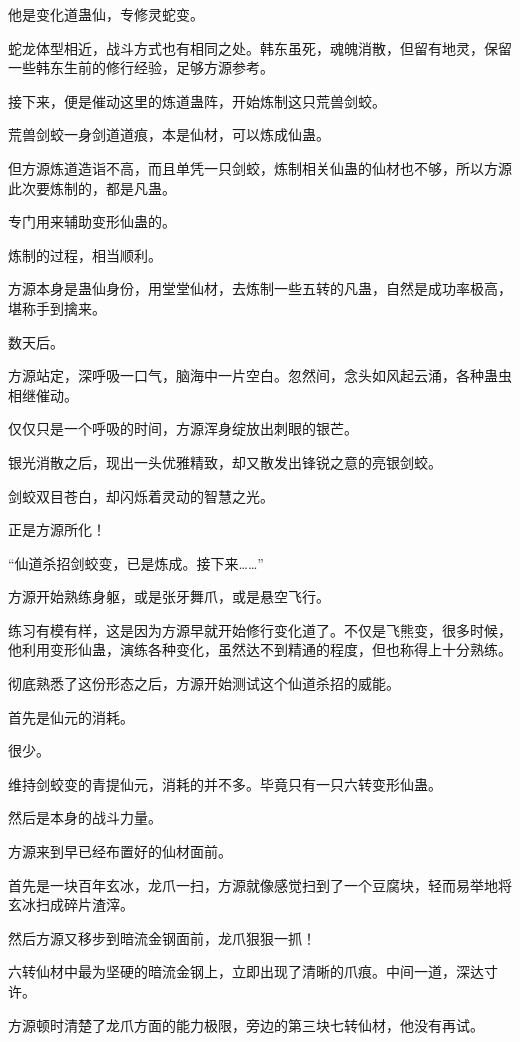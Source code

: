 \begin{this_body}
他是变化道蛊仙，专修灵蛇变。

蛇龙体型相近，战斗方式也有相同之处。韩东虽死，魂魄消散，但留有地灵，保留一些韩东生前的修行经验，足够方源参考。

接下来，便是催动这里的炼道蛊阵，开始炼制这只荒兽剑蛟。

荒兽剑蛟一身剑道道痕，本是仙材，可以炼成仙蛊。

但方源炼道造诣不高，而且单凭一只剑蛟，炼制相关仙蛊的仙材也不够，所以方源此次要炼制的，都是凡蛊。

专门用来辅助变形仙蛊的。

炼制的过程，相当顺利。

方源本身是蛊仙身份，用堂堂仙材，去炼制一些五转的凡蛊，自然是成功率极高，堪称手到擒来。

数天后。

方源站定，深呼吸一口气，脑海中一片空白。忽然间，念头如风起云涌，各种蛊虫相继催动。

仅仅只是一个呼吸的时间，方源浑身绽放出刺眼的银芒。

银光消散之后，现出一头优雅精致，却又散发出锋锐之意的亮银剑蛟。

剑蛟双目苍白，却闪烁着灵动的智慧之光。

正是方源所化！

“仙道杀招剑蛟变，已是炼成。接下来……”

方源开始熟练身躯，或是张牙舞爪，或是悬空飞行。

练习有模有样，这是因为方源早就开始修行变化道了。不仅是飞熊变，很多时候，他利用变形仙蛊，演练各种变化，虽然达不到精通的程度，但也称得上十分熟练。

彻底熟悉了这份形态之后，方源开始测试这个仙道杀招的威能。

首先是仙元的消耗。

很少。

维持剑蛟变的青提仙元，消耗的并不多。毕竟只有一只六转变形仙蛊。

然后是本身的战斗力量。

方源来到早已经布置好的仙材面前。

首先是一块百年玄冰，龙爪一扫，方源就像感觉扫到了一个豆腐块，轻而易举地将玄冰扫成碎片渣滓。

然后方源又移步到暗流金钢面前，龙爪狠狠一抓！

六转仙材中最为坚硬的暗流金钢上，立即出现了清晰的爪痕。中间一道，深达寸许。

方源顿时清楚了龙爪方面的能力极限，旁边的第三块七转仙材，他没有再试。

\end{this_body}

